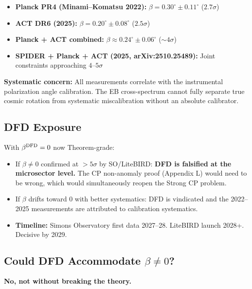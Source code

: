 \documentclass[11pt]{article}
\begin{document}
\begin{itemize}
\item \textbf{Planck PR4 (Minami--Komatsu 2022):}
  $\beta = 0.30^\circ \pm 0.11^\circ$ ($2.7\sigma$)
\item \textbf{ACT DR6 (2025):}
  $\beta = 0.20^\circ \pm 0.08^\circ$ ($2.5\sigma$)
\item \textbf{Planck + ACT combined:}
  $\beta \approx 0.24^\circ \pm 0.06^\circ$ ($\sim 4\sigma$)
\item \textbf{SPIDER + Planck + ACT (2025, arXiv:2510.25489):}
  Joint constraints approaching $4$--$5\sigma$
\end{itemize}

\textbf{Systematic concern:} All measurements correlate with
the instrumental polarization angle calibration.  The EB
cross-spectrum cannot fully separate true cosmic rotation from
systematic miscalibration without an absolute calibrator.

\subsection{DFD Exposure}

With $\beta^{\rm DFD} = 0$ now Theorem-grade:

\begin{itemize}
\item If $\beta \neq 0$ confirmed at $> 5\sigma$ by SO/LiteBIRD:
  \textbf{DFD is falsified at the microsector level.}  The CP
  non-anomaly proof (Appendix L) would need to be wrong, which
  would simultaneously reopen the Strong CP problem.

\item If $\beta$ drifts toward $0$ with better systematics:
  DFD is vindicated and the 2022--2025 measurements are
  attributed to calibration systematics.

\item \textbf{Timeline:} Simons Observatory first data 2027--28.
  LiteBIRD launch 2028+.  Decisive by 2029.
\end{itemize}

\subsection{Could DFD Accommodate $\beta \neq 0$?}

\textbf{No, not without breaking the theory.}
\end{document}
